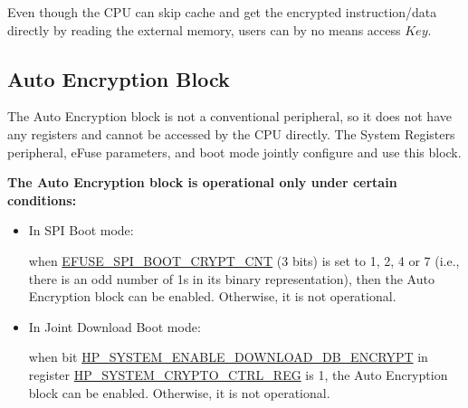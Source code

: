 \documentclass[main\_\_EN.tex]{subfiles}
\begin{document}
\begin{tiplisting}
\vspace{-2em}
\begin{enumerate}
Even though the CPU can skip cache and get the encrypted instruction/data directly by reading the external memory, users can by no means access \begin{math}\mathit{Key}\end{math}.
\end{enumerate}
\end{tiplisting}

\subsection{Auto Encryption Block}

The Auto Encryption block is not a conventional peripheral, so it does not have any registers and cannot be accessed by the CPU directly. The System Registers peripheral, eFuse parameters, and boot mode jointly configure and use this block.

\textbf{The Auto Encryption block is operational only under certain conditions:}

\begin{itemize}

    \item In SPI Boot mode:

    when \hyperref[fielddesc:EFUSESPIBOOTCRYPTCNT]{EFUSE\_SPI\_BOOT\_CRYPT\_CNT} (3 bits) is set to 1, 2, 4 or 7 (i.e., there is an odd number of 1s in its binary representation), then the Auto Encryption block can be enabled. Otherwise, it is not operational.

    \item In Joint Download Boot mode:

    when bit \hyperref[fielddesc:HPSYSTEMENABLEDOWNLOADDBENCRYPT]{HP\_SYSTEM\_ENABLE\_DOWNLOAD\_DB\_ENCRYPT} in register \hyperref[regdesc:HPSYSTEMCRYPTOCTRLREG]{HP\_SYSTEM\_CRYPTO\_CTRL\_REG} is 1, the Auto Encryption block can be enabled. Otherwise, it is not operational.
\end{itemize}
\end{document}
